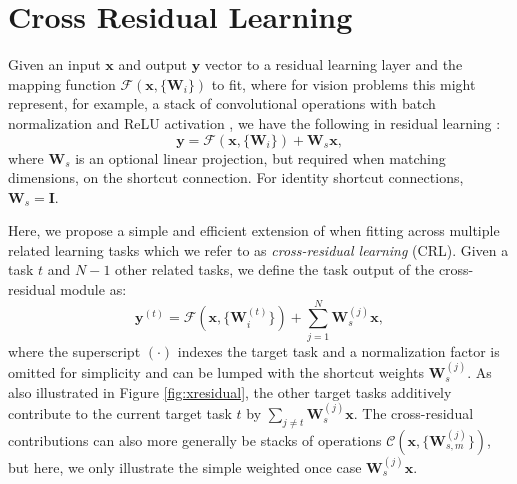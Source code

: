\documentclass{sig-alternate-05-2015}
\newcommand{\mb}{\mathbf}
\begin{document}
\section{Cross Residual Learning}
\label{sec:xresidual}

Given an input $\mb x$ and output $\mb y$ vector to a residual learning layer and the mapping function $\mathcal{F}(\mb x, \{\mb W_i\})$ to fit, where for vision problems this might represent, for example, a stack of convolutional operations with batch normalization \cite{ioffe_2015} and ReLU activation \cite{nair_2010}, we have the following in residual learning \cite{he_2016}:
\begin{equation}
  \mb y = \mathcal{F}(\mb x, \{\mb W_i\}) + \mb W_s\mb x,
  \label{eq:residual}
\end{equation}
where $\mb W_s$ is an optional linear projection, but required when matching dimensions, on the shortcut connection.
For identity shortcut connections, $\mb W_s = \mb I$.

Here, we propose a simple and efficient extension of \cite{he_2016} when fitting across multiple related learning tasks which we refer to as \emph{cross-residual learning} (CRL).
Given a task $t$ and $N-1$ other related tasks, we define the task output of the cross-residual module as:
\begin{equation}
  \mb y^{(t)} = \mathcal{F}(\mb x, \{\mb W_i^{(t)}\}) + \sum_{j=1}^N \mb W_s^{(j)}\mb x,
  \label{eq:xresidual}
\end{equation}
where the superscript $(\cdot)$ indexes the target task and a normalization factor is omitted for simplicity and can be lumped with the shortcut weights $\mb W_s^{(j)}$.
As also illustrated in Figure \ref{fig:xresidual}, the other target tasks additively contribute to the current target task $t$ by $\sum_{j\neq t}\mb W_s^{(j)}\mb x$.
The cross-residual contributions can also more generally be stacks of operations $\mathcal{C}(\mb x,\{\mb W_{s,m}^{(j)}\})$, but here, we only illustrate the simple weighted once case $\mb W_s^{(j)}\mb x$.
\end{document}
